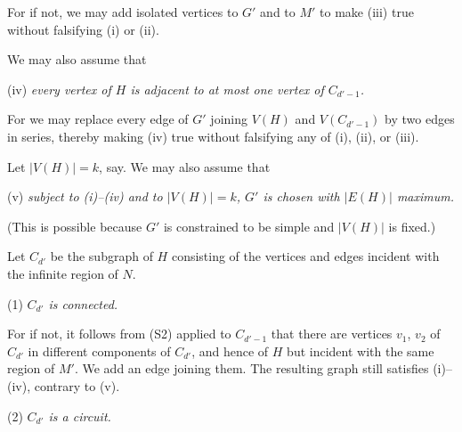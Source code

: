 For if not, we may add isolated vertices to $G'$ and to $M'$ to make (iii) true without falsifying (i) or (ii).

We may also assume that

\hspace*{12pt}(iv) \textit{every vertex of $H$ is adjacent to at most one vertex of $C_{d'-1}$.}

For we may replace every edge of $G'$ joining $V(H)$ and $V(C_{d'-1})$ by two edges in series, thereby making (iv) true without falsifying any of (i), (ii), or (iii).

Let $|V(H)| = k$, say. We may also assume that

\hspace*{12pt}(v) \textit{subject to (i)--(iv) and to $|V(H)| = k$, $G'$ is chosen with $|E(H)|$ maximum.}

(This is possible because $G'$ is constrained to be simple and $|V(H)|$ is fixed.)

Let $C_{d'}$ be the subgraph of $H$ consisting of the vertices and edges incident with the infinite region of $N$.

\hspace*{12pt}(1) \textit{$C_{d'}$ is connected.}

For if not, it follows from (S2) applied to $C_{d'-1}$ that there are vertices $v_1$, $v_2$ of $C_{d'}$ in different components of $C_{d'}$, and hence of $H$ but incident with the same region of $M'$. We add an edge joining them. The resulting graph still satisfies (i)--(iv), contrary to (v).

\hspace*{12pt}(2) \textit{$C_{d'}$ is a circuit.}

